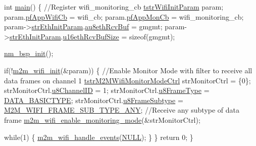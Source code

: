 \begin{DoxyCode}
\textcolor{keywordtype}{int} \hyperlink{demo_2microchip_2pic32mz__ef__curiosity_2wifi__http__server__demo_2src_2main_8c_ac5a1eca594b063e0d2dbccf86f96f221}{main}()
\{
    \textcolor{comment}{//Register wifi\_monitoring\_cb }
    \hyperlink{structtstrWifiInitParam}{tstrWifiInitParam} param;
    param.\hyperlink{group__WifiSetCustInfoElementFn_ga13d5fa7a0c71fd59bbf36a61923835cc}{pfAppWifiCb} = wifi\_cb;
    param.\hyperlink{group__WifiSetCustInfoElementFn_gabbd16bbde19ebb6cea2ff732b84421e8}{pfAppMonCb}  = wifi\_monitoring\_cb;
    param->\hyperlink{group__WifiSetCustInfoElementFn_gac72757e663d13b9c446735a5dca54eb1}{strEthInitParam}.\hyperlink{group__WifiSetCustInfoElementFn_gaa0328252052cf33e1ca7c695e238a067}{au8ethRcvBuf} = gmgmt;
    param->\hyperlink{group__WifiSetCustInfoElementFn_gac72757e663d13b9c446735a5dca54eb1}{strEthInitParam}.\hyperlink{group__WifiSetCustInfoElementFn_ga536ae78324c98515266f493c81da12ab}{u16ethRcvBufSize} = \textcolor{keyword}{sizeof}(gmgmt);
    
    \hyperlink{group__NmBspInitFn_ga91533a50cf3da832110a746b4a57789e}{nm\_bsp\_init}();
    
    \textcolor{keywordflow}{if}(!\hyperlink{group__WifiInitFn_ga73c734812e844d96d860c4e93e9daf35}{m2m\_wifi\_init}(&param)) \{
        \textcolor{comment}{//Enable Monitor Mode with filter to receive all data frames on channel 1}
        \hyperlink{structtstrM2MWifiMonitorModeCtrl}{tstrM2MWifiMonitorModeCtrl}  strMonitorCtrl = \{0\};
        strMonitorCtrl.\hyperlink{structtstrM2MWifiMonitorModeCtrl_aa171fa84ecfab4b966e935825f1f23f6}{u8ChannelID}      = 1;
        strMonitorCtrl.\hyperlink{structtstrM2MWifiMonitorModeCtrl_a1302bd34bc71c93586443e1bfa0e5b20}{u8FrameType}      = \hyperlink{group__WlanEnums_gga593eb9b713b71fcc9cae6e81393b40d9a297b5ad5452f3000106b51741f65aee9}{DATA\_BASICTYPE};
        strMonitorCtrl.\hyperlink{structtstrM2MWifiMonitorModeCtrl_a98f14e2b9c2aa0288517362886b9608a}{u8FrameSubtype}   = 
      \hyperlink{group__WlanDefines_ga63b89cf8396db0c50077e1fec7f3d0ed}{M2M\_WIFI\_FRAME\_SUB\_TYPE\_ANY}; \textcolor{comment}{//Receive any subtype of data frame}
        \hyperlink{group__WifiEnableMonitorModeFn_gac208f9fc4c1ac93d3fc3e8a81c3c2223}{m2m\_wifi\_enable\_monitoring\_mode}(&strMonitorCtrl);
        
        \textcolor{keywordflow}{while}(1) \{
            \hyperlink{group__WifiHandleEventsFn_ga461a4edc057cec8c00cf124a07aa3b02}{m2m\_wifi\_handle\_events}(\hyperlink{group__BSPDefine_ga070d2ce7b6bb7e5c05602aa8c308d0c4}{NULL});
        \}
    \}
    \textcolor{keywordflow}{return} 0;
\}
\end{DoxyCode}
 

